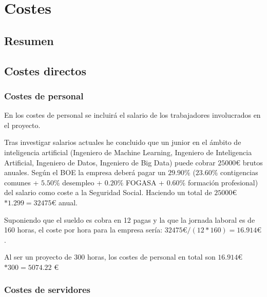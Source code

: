 \chapter{Costes}\label{costes}

\section{Resumen}\label{sec:resumencostes}


\section{Costes directos}\label{sec:costesdirectos}

\subsection{Costes de personal}\label{subsec:personal}

En los costes de personal se incluirá el salario de los trabajadores involucrados en el proyecto. 

Tras investigar salarios actuales he concluido que un junior en el ámbito de inteligencia artificial (Ingeniero de Machine Learning, Ingeniero de Inteligencia Artificial, Ingeniero de Datos, Ingeniero de Big Data) puede cobrar $25000 $€$ $ brutos anuales. Según el BOE \cite{BOE} la empresa deberá pagar un $29.90\%$ ($23.60\%$ contigencias comunes + $5.50\%$ desempleo + $0.20\%$ FOGASA + $0.60\%$ formación profesional) del salario como coste a la Seguridad Social. Haciendo un total de $25000 $€$ * 1.299 = 32475 $€ anual.

Suponiendo que el sueldo es cobra en 12 pagas y la que la jornada laboral es de 160 horas, el coste por hora para la empresa sería: $32475 $€$ / (12 * 160) = 16.914$€ .

Al ser un proyecto de 300 horas, los costes de personal en total son $16.914 $€$ * 300 = 5074.22 $ €

\subsection{Costes de servidores}\label{subsec:servidores}

